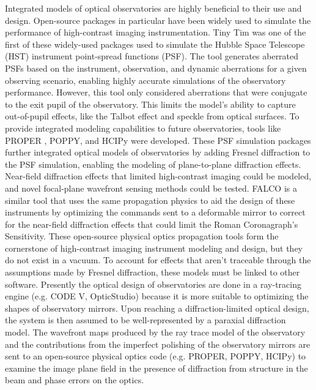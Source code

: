 Integrated models of optical observatories are highly beneficial to their use and design\cite{anderson_integrated_2011}. Open-source packages in particular have been widely used to simulate the performance of high-contrast imaging instrumentation. Tiny Tim was one of the first of these widely-used packages used to simulate the Hubble Space Telescope (HST)  instrument point-spread functions (PSF)\cite{Krist93}. The tool generates aberrated PSFs based on the instrument, observation, and dynamic aberrations for a given observing scenario, enabling highly accurate simulations of the observatory performance. However, this tool only considered aberrations that were conjugate to the exit pupil of the observatory. This limits the model's ability to capture out-of-pupil effects, like the Talbot effect and speckle from optical surfaces.
 To provide integrated modeling capabilities to future observatories, tools like PROPER \cite{Krist07}, POPPY\cite{Doug18}, and HCIPy \cite{por2018hcipy} were developed. These PSF simulation packages further integrated optical models of observatories by adding Fresnel diffraction to the PSF simulation, enabling the modeling of plane-to-plane diffraction effects. Near-field diffraction effects that limited high-contrast imaging could be modeled, and novel focal-plane wavefront sensing methods could be tested. FALCO\cite{Riggs18} is a similar tool that uses the same propagation physics to aid the design of these instruments by optimizing the commands sent to a deformable mirror to correct for the near-field diffraction effects that could limit the Roman Coronagraph's Sensitivity. These open-source physical optics propagation tools form the cornerstone of high-contrast imaging instrument modeling and design, but they do not exist in a vacuum. To account for effects that aren't traceable through the assumptions made by Fresnel diffraction, these models must be linked to other software.
Presently the optical design of observatories are done in a ray-tracing engine (e.g. CODE V, OpticStudio) because it is more suitable to optimizing the shapes of observatory mirrors. Upon reaching a diffraction-limited optical design, the system is then assumed to be well-represented by a paraxial diffraction model. The wavefront maps produced by the ray trace model of the observatory and the contributions from the imperfect polishing of the observatory mirrors are sent to an open-source physical optics code (e.g. PROPER, POPPY, HCIPy) to examine the image plane field in the presence of diffraction from structure in the beam and phase errors on the optics. 

